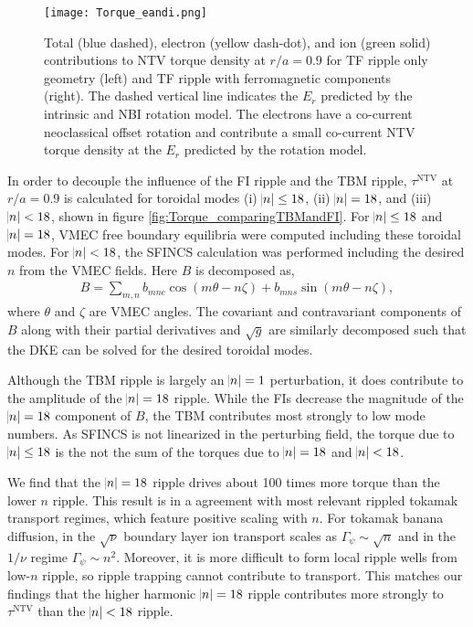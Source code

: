 \documentclass[aip, pop, preprint]{revtex4-1}
\numberwithin{figure}{section}
\numberwithin{equation}{section}
\begin{document}
\begin{figure}[h!]
\centering
\texttt{[image: Torque\_eandi.png]}
\caption{\label{fig:Torque_eandi} Total (blue dashed), electron (yellow dash-dot), and ion (green solid) contributions to NTV torque density at $r/a = 0.9$ for TF ripple only geometry (left) and TF ripple with ferromagnetic components (right). The dashed vertical line indicates the $E_r$ predicted by the intrinsic and NBI rotation model. The electrons have a co-current neoclassical offset rotation and contribute a small co-current NTV torque density at the $E_r$ predicted by the rotation model.}
\end{figure}

In order to decouple the influence of the FI ripple and the TBM ripple, $\tau^{\text{NTV}}$ at $r/a = 0.9$ is calculated for toroidal modes (i) $\abs{n} \leq 18$, (ii) $\abs{n} = 18$, and (iii) $\abs{n} < 18$, shown in figure \ref{fig:Torque_comparingTBMandFI}. For $\abs{n} \leq 18$ and $\abs{n} = 18$, VMEC free boundary equilibria were computed including these toroidal modes. For $\abs{n} < 18$, the SFINCS calculation was performed including the desired $n$ from the VMEC fields. Here $B$ is decomposed as,
\begin{gather}
B = \sum_{m,n} b_{mnc} \cos(m\theta-n\zeta) + b_{mns} \sin(m\theta-n\zeta),
\end{gather}
where $\theta$ and $\zeta$ are VMEC angles. The covariant and contravariant components of $B$ along with their partial derivatives and $\sqrt{g}$ are similarly decomposed such that the DKE can be solved for the desired toroidal modes.

Although the TBM ripple is largely an $\abs{n} = 1$ perturbation, it does contribute to the amplitude of the $\abs{n} = 18$ ripple. While the FIs decrease the magnitude of the $\abs{n} =18$ component of $B$, the TBM contributes most strongly to low mode numbers. As SFINCS is not linearized in the perturbing field, the torque due to $\abs{n} \leq 18$ is the not the sum of the torques due to $\abs{n} = 18$ and $\abs{n} < 18$. 

We find that the $\abs{n} = 18$ ripple drives about 100 times more torque than the lower $n$ ripple. This result is in a agreement with most relevant rippled tokamak transport regimes, which feature positive scaling with $n$. For tokamak banana diffusion, in the $\sqrt{\nu}$ boundary layer\cite{Shaing2008} ion transport scales as $\Gamma_{\psi} \sim \sqrt{n}$ and in the $1/\nu$ regime\cite{Shaing2003} $\Gamma_{\psi} \sim n^2$. Moreover, it is more difficult to form local ripple wells from low-$n$ ripple, so ripple trapping cannot contribute to transport. This matches our findings that the higher harmonic $\abs{n} = 18$ ripple contributes more strongly to $\tau^{\text{NTV}}$ than the $\abs{n} < 18$ ripple. 
\end{document}
